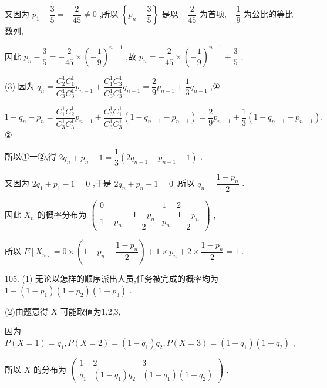 又因为 ${p}_{1} - \dfrac{3}{5} =  - \dfrac{2}{45} \neq  0$ ,所以 $\left\{  {{p}_{n} - \dfrac{3}{5}}\right\}$ 是以 $- \dfrac{2}{45}$ 为首项, $- \dfrac{1}{9}$ 为公比的等比数列,

因此 ${p}_{n} - \dfrac{3}{5} =  - \dfrac{2}{45} \times  {\left( -\dfrac{1}{9}\right) }^{n - 1}$ ,故 ${p}_{n} =  - \dfrac{2}{45} \times  {\left( -\dfrac{1}{9}\right) }^{n - 1} + \dfrac{3}{5}$ .

(3) 因为 ${q}_{n} = \dfrac{{C}_{2}^{1}{C}_{1}^{1}}{{C}_{3}^{1}{C}_{3}^{1}}{p}_{n - 1} + \dfrac{{C}_{1}^{1}{C}_{3}^{1}}{{C}_{3}^{1}{C}_{3}^{1}}{q}_{n - 1} = \dfrac{2}{9}{p}_{n - 1} + \dfrac{1}{3}{q}_{n - 1}$ ,①

$1 - {q}_{n} - {p}_{n} = \dfrac{{C}_{1}^{1}{C}_{2}^{1}}{{C}_{3}^{1}{C}_{3}^{1}}{p}_{n - 1} + \dfrac{{C}_{3}^{1}{C}_{1}^{1}}{{C}_{3}^{1}{C}_{3}^{1}}\left( {1 - {q}_{n - 1} - {p}_{n - 1}}\right)  = \dfrac{2}{9}{p}_{n - 1} + \dfrac{1}{3}\left( {1 - {q}_{n - 1} - {p}_{n - 1}}\right) .$ ②

所以①一②,得 $2{q}_{n} + {p}_{n} - 1 = \dfrac{1}{3}\left( {2{q}_{n - 1} + {p}_{n - 1} - 1}\right)$ .

又因为 $2{q}_{1} + {p}_{1} - 1 = 0$ ,于是 $2{q}_{n} + {p}_{n} - 1 = 0$ ,所以 ${q}_{n} = \dfrac{1 - {p}_{n}}{2}$ .

因此 ${X}_{n}$ 的概率分布为 $\left( \begin{matrix} 0 & 1 & 2 \\  1 - {p}_{n} - \dfrac{1 - {p}_{n}}{2} & {p}_{n} & \dfrac{1 - {p}_{n}}{2} \end{matrix}\right)$ ,

所以 $E\left\lbrack  {X}_{n}\right\rbrack   = 0 \times  \left( {1 - {p}_{n} - \dfrac{1 - {p}_{n}}{2}}\right)  + 1 \times  {p}_{n} + 2 \times  \dfrac{1 - {p}_{n}}{2} = 1$ .

105. (1) 无论以怎样的顺序派出人员,任务被完成的概率均为 $1 - \left( {1 - {p}_{1}}\right) \left( {1 - {p}_{2}}\right) \left( {1 - {p}_{3}}\right)$ .

(2)由题意得 $X$ 可能取值为1,2,3,

因为 $P\left( {X = 1}\right)  = {q}_{1},P\left( {X = 2}\right)  = \left( {1 - {q}_{1}}\right) {q}_{2},P\left( {X = 3}\right)  = \left( {1 - {q}_{1}}\right) \left( {1 - {q}_{2}}\right)$ ,

所以 $X$ 的分布为 $\left( \begin{matrix} 1 & 2 & 3 \\  {q}_{1} & \left( {1 - {q}_{1}}\right) {q}_{2} & \left( {1 - {q}_{1}}\right) \left( {1 - {q}_{2}}\right)  \end{matrix}\right)$ ,

